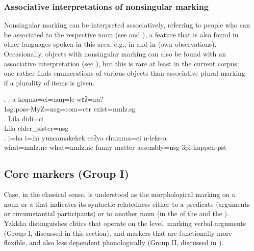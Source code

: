 \subsubsection{Associative interpretations of nonsingular marking}\label{number-2}

Nonsingular marking can be interpreted associatively, referring to people who can be associated to the respective noun (see \Next[a] and \Next[b]), a feature that is also found in other languages spoken in this area, e.g., in  \cite[98]{Genetti2007_Newari} and in  (own observations). Occasionally, objects with nonsingular marking can also be found with an associative interpretation (see \Next[c]), but this is rare at least in the current corpus; one rather finds enumerations of various objects than associative plural marking if a plurality of items is given.
                                      

\ex. \ag. a-koŋma=ci=nuŋ=le wɛʔ=na?\\
		{\sc 1sg.poss-}MyZ{\sc =nsg=com=ctr} exist{\sc [3sg]=nmlz.sg}\\
		  
	\bg. Lila didi=ci\\
		Lila elder\_sister{\sc =nsg}\\
		  
		\bg.  i=ha i=ha    yuncamakekek ceʔya chumma=ci     n-leks-a\\
		what{\sc =nmlz.nc} what{\sc =nmlz.nc} funny        matter assembly{\sc =nsg} {\sc 3pl-}happen{\sc -pst}\\
		 
	
\subsection{Core  markers (Group I)}\label{case}

Case, in the classical sense, is understood as the morphological marking on a noun or a  that indicates its syntactic relatedness either to a predicate (arguments or circumstantial participants)  or to  another noun (in the  of the  and the ). Yakkha distinguishes   clitics  that operate on the  level, marking verbal arguments  (Group I, discussed in this section), and markers that are functionally more flexible, and also less dependent phonologically (Group II, discussed in ).


